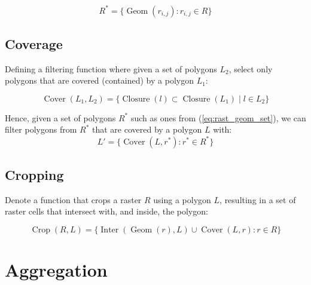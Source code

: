 \documentclass{article}
\begin{document}
\begin{equation} \label{eq:rast_geom_set}
    R^* = \{ \operatorname{Geom}(r_{i,j}) : r_{i,j} \in R \}
\end{equation}



\subsection{Coverage}

Defining a filtering function where given a set of polygons $L_2$, select only polygons that are covered (contained) by a polygon $L_1$:

\begin{equation}
    \operatorname{Cover}(L_1, L_2) = \{
        \operatorname{Closure}(l) \subset \operatorname{Closure}(L_1) \mid l \in L_2
    \}
\end{equation}

Hence, given a set of polygons $R^*$ such as ones from (\ref{eq:rast_geom_set}), we can filter polygons from $R^*$ that are covered by a polygon $L$ with:
\begin{equation}
    L' = \{ \operatorname{Cover}(L, r^*) : r^* \in R^* \}
\end{equation}


\subsection{Cropping}

Denote a function that crops a raster $R$ using a polygon $L$, resulting in a set of raster cells that intersect with, and inside, the polygon:

\begin{equation}
    \operatorname{Crop}(R, L) = \{
        \operatorname{Inter}(\operatorname{Geom}(r), L)
        \cup
        \operatorname{Cover}(L, r)
        :r \in R
    \}
\end{equation}

\section{Aggregation}
\end{document}
